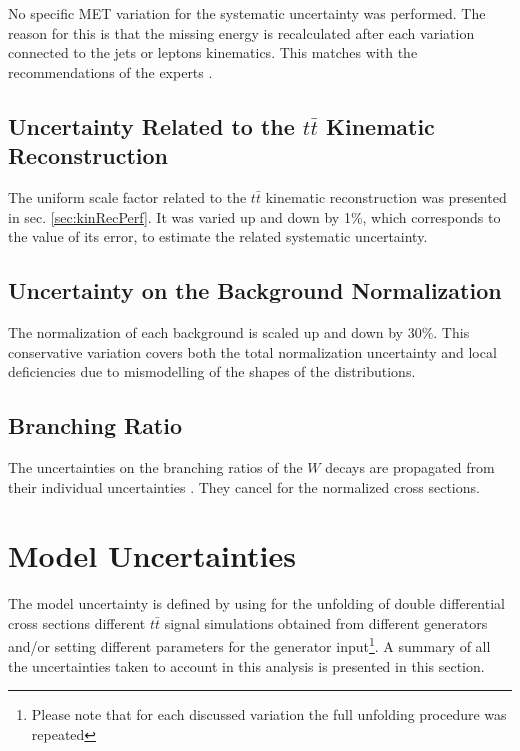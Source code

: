 No specific MET variation for the systematic uncertainty was performed. The reason for this is that the missing energy is recalculated
after each variation connected to the jets or leptons kinematics. This matches with the recommendations of the experts \cite{CMS-PAS-JME-12-002}.

\subsection{Uncertainty Related to the $t\bar{t}$ Kinematic Reconstruction}

The uniform scale factor related to the $t\bar{t}$ kinematic reconstruction was presented in sec. \ref{sec:kinRecPerf}. It was varied 
up and down by 1\%, which corresponds to the value of its error, to estimate the related systematic uncertainty.

\subsection{Uncertainty on the Background Normalization}

The normalization of each background is scaled up and down by 30$\%$\cite{Asin2014Auth}. This conservative variation covers both the 
total normalization uncertainty and local deficiencies due to mismodelling of the shapes of the distributions. 

\subsection{Branching Ratio}

The uncertainties on the branching ratios of the $W$ decays are propagated from their individual uncertainties \cite{PDG-2012}.
They cancel for the normalized cross sections.
\section{Model Uncertainties}

The model uncertainty is defined by using for the unfolding of double differential cross sections different $t\bar{t}$ signal simulations 
obtained from different generators and/or setting
different parameters for the generator input\footnote{Please note that for each discussed variation the full unfolding procedure was
repeated}. A summary of all the uncertainties taken to account in this analysis is presented in this section.

